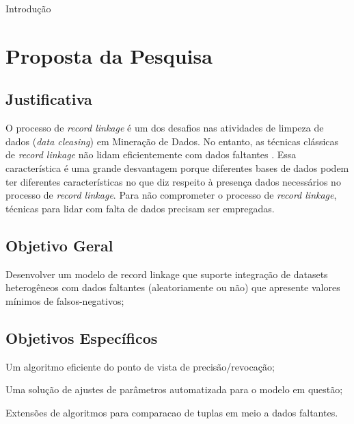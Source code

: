 \documentclass[
	12pt,				%
	openany,			%
	twoside,			%
	a4paper,			%
	brazil,				%
	]{unimontes-ppgmsc-abntex2}
\begin{document}
Introdução


\chapter{Proposta da Pesquisa}

\section{Justificativa}O processo de \textit{record linkage} é um dos desafios nas atividades de limpeza de dados (\textit{data cleasing}) em Mineração de Dados. No entanto, as técnicas clássicas de \textit{record linkage} não lidam eficientemente com dados faltantes \cite{ong}. Essa característica é uma grande desvantagem porque diferentes bases de dados podem ter diferentes características no que diz respeito à presença dados necessários no processo de \textit{record linkage}. Para não comprometer o processo de \textit{record linkage}, técnicas para lidar com falta de dados precisam ser empregadas.

\section{Objetivo Geral} Desenvolver um modelo de record linkage que suporte integração de datasets heterogêneos com dados faltantes (aleatoriamente ou não) que apresente valores mínimos de falsos-negativos;

\section{Objetivos Específicos}
\begin{alineas}
        \item Um algoritmo eficiente do ponto de vista de precisão/revocação;
        \item Uma solução de ajustes de parâmetros automatizada para o modelo em questão;
        \item Extensões de algoritmos para comparacao de tuplas em meio a dados faltantes. 
\end{alineas}
\end{document}
